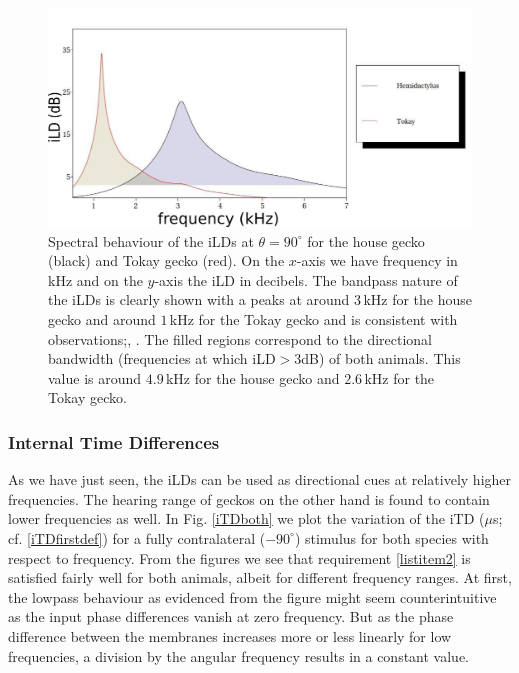 \begin{figure}[ht!]
\centering
  \includegraphics[width=.9\linewidth]{Diagrams/Plots/iLD/iLDspectrumboth2.png}
  \caption[Spectral behavior of the iLDs.]{Spectral behaviour of the iLDs at $\theta=90^\circ$ for the house gecko (black) and Tokay gecko (red). On the $x$-axis we have frequency in kHz and on the $y$-axis the iLD in decibels.
  The bandpass nature of the iLDs is clearly shown with a peaks at around $3\,$kHz for the house gecko and around $1\,$kHz for the Tokay gecko and is consistent with observations;\cite{dalsgaardmanley1}, \cite{dalsgaardmanley2}. The
  filled regions correspond to the directional bandwidth (frequencies at which iLD$>$3dB) of both animals. This value is around $4.9\,$kHz for the house gecko and $2.6\,$kHz
  for the Tokay gecko.}
  \label{iLDspectrum}
\end{figure}

\subsubsection{Internal Time Differences}\label{itdsubsection}
As we have just seen, the iLDs can be used as directional cues at relatively higher frequencies. The hearing range of geckos
on the other hand is found to contain lower frequencies as well. In Fig. \ref{iTDboth} we plot the variation of the iTD ($\mu$s; cf. \eqref{iTDfirstdef}) for 
a fully contralateral ($-90^\circ$) stimulus for both species with respect to frequency. From the figures we see that requirement \ref{listitem2} is satisfied fairly
well for both animals, albeit for different frequency ranges. At first, the lowpass behaviour as evidenced from the figure might seem counterintuitive as the
input phase differences vanish at zero frequency. But as the phase difference between the membranes increases more or less linearly for low frequencies,
a division by the angular frequency results in a constant value.

